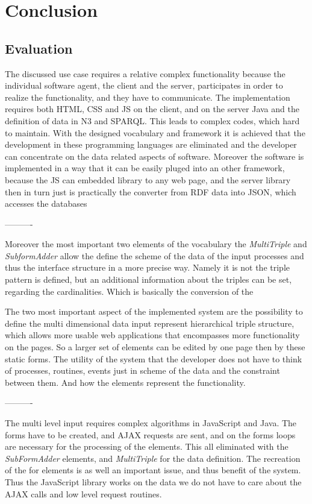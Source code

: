 

\chapter{Conclusion}

\section{Evaluation}




The discussed use case requires a relative complex functionality because the individual software agent, the client and the server, participates in order to realize the functionality, and they have to communicate. The implementation requires both HTML, CSS and JS on the client, and on the server Java and the definition of data in N3 and SPARQL. This leads to complex codes, which hard to maintain. With the designed vocabulary and framework it is achieved that the development in these programming languages are eliminated and the developer can concentrate on the data related aspects of software. Moreover the software is implemented in a way that it can be easily pluged into an other framework, because the JS can embedded library to any web page, and the server library then in turn just is practically the converter from RDF data into JSON, which accesses the databases


----------

Moreover the most important two elements of the vocabulary the \textit{MultiTriple} and \textit{SubformAdder} allow the define the scheme of the data of the input processes and thus the interface structure in a more precise way. Namely it is not the triple pattern is defined, but an additional information about the triples can be set, regarding the cardinalities. Which is basically the conversion of the  


The two most important aspect of the implemented system are the possibility to define the multi dimensional data input represent hierarchical triple structure, which allows more usable web applications that encompasses more functionality on the pages. So a larger set of elements can be edited by one page then by these static forms. The utility of the system that the developer does not have to think of processes, routines, events just in scheme of the data and the constraint between them. And how the elements represent the functionality. 

----------

The multi level input requires complex algorithms in JavaScript and Java. The forms have to be created, and AJAX requests are sent, and on the forms loops are necessary for the processing of the elements. This all eliminated with the \textit{SubFormAdder} elements, and \textit{MultiTriple} for the data definition. The recreation of the for elements is as well an important issue, and thus benefit of the system. Thus the JavaScript library works on the data we do not have to care about the AJAX calls and low level request routines. 

